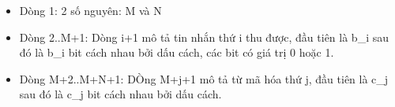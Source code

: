 \begin{itemize}
	\item     Dòng 1: 2 số nguyên: M và N   
	\item     Dòng 2..M+1: Dòng i+1 mô tả tin nhắn thứ i thu được, đầu tiên là b\_i         sau đó là b\_i bit cách nhau bởi dấu cách, các bit có giá trị 0 hoặc 1.   
	\item     Dòng M+2..M+N+1: DÒng M+j+1 mô tả từ mã hóa thứ j, đầu tiên là c\_j         sau đó là c\_j bit cách nhau bởi dấu cách.   
\end{itemize}